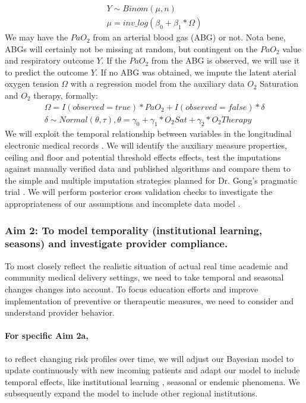 \documentclass[11pt,notitlepage]{article}
\begin{document}
\begin{align}
Y \sim Binom(\mu, n) \\
\mu = inv\_log(\beta_{0} + \beta_{1} * \Omega)
\end{align} 
We may have the $PaO_{2}$ from an arterial blood gas (ABG) or not. Nota bene, ABGs will certainly not be missing at random, but contingent on the $PaO_2$ value and respiratory outcome $Y$. If the $PaO_{2}$ from the ABG is observed, we will use it to predict the outcome $Y$. If no ABG was obtained, we impute the latent aterial oxygen tension $\Omega$ with a regression model from the auxiliary data  $O_{2}$ Saturation and $O_{2}$ therapy, formally:
\begin{align}
\Omega =  I(observed = true) * PaO_{2}   +   I(observed = false) * \delta  \\ 
\delta \sim Normal(\theta, \tau), 
\theta = \gamma_{0} + \gamma_{1}* O_{2} Sat + \gamma_{2} * O_{2} Therapy
\end{align}
We will exploit the temporal relationship between variables in the longitudinal electronic medical records \cite{Welch24782349}. We will identify the auxiliary measure properties, ceiling and floor and potential threshold effects effects, test the imputations against manually verified data and published algorithms and compare them to the simple and multiple imputation strategies planned for Dr. Gong's pragmatic trial \cite{Huntington_16311133,Sloan_15027501}.  We will perform posterior cross validation checks to investigate the appropriateness of our assumptions and incomplete data model \cite{Gelman1998notasked}.

\subsubsection*{Aim 2: To model temporality (institutional learning, seasons) and investigate provider compliance.}
To most closely reflect the realistic situation of actual real time academic and community medical delivery settings, we need to take temporal and seasonal changes changes into account. To focus education efforts and improve implementation of preventive or therapeutic measures, we need to consider and understand provider behavior. 

\paragraph*{For specific Aim 2a,} to reflect changing risk profiles over time, we will adjust our Bayesian model to update continuously with new incoming patients and adapt our model to include temporal effects, like institutional learning , seasonal or endemic phenomena. We subsequently expand the model to include other regional institutions.
\end{document}

